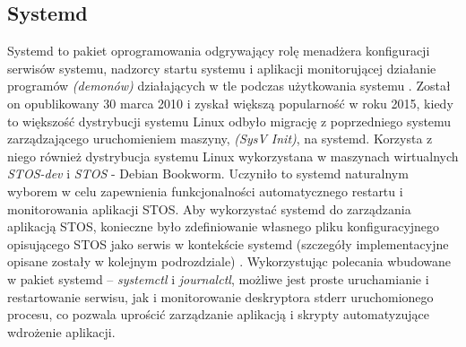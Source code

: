 \subsection{Systemd}
Systemd to pakiet oprogramowania odgrywający rolę menadżera konfiguracji serwisów systemu, nadzorcy startu systemu i aplikacji monitorującej działanie programów \textit{(demonów)} działających w tle podczas użytkowania systemu \cite{systemd}. Został on opublikowany 30 marca 2010 i zyskał większą popularność w roku 2015, kiedy to większość dystrybucji systemu Linux odbyło migrację z poprzedniego systemu zarządzającego uruchomieniem maszyny, \textit{(SysV Init)}, na systemd. Korzysta z niego również dystrybucja systemu Linux wykorzystana w maszynach wirtualnych \textit{STOS-dev} i \textit{STOS} - Debian Bookworm. Uczyniło to systemd naturalnym wyborem w celu zapewnienia funkcjonalności automatycznego restartu i monitorowania aplikacji STOS. 
\newline \noindent Aby wykorzystać systemd do zarządzania aplikacją STOS, konieczne było zdefiniowanie własnego pliku konfiguracyjnego opisującego STOS jako serwis w kontekście systemd (szczegóły implementacyjne opisane zostały w kolejnym podrozdziale) \cite{systemd-service}. Wykorzystując polecania wbudowane w pakiet systemd -- \textit{systemctl} i \textit{journalctl}, możliwe jest proste uruchamianie i restartowanie serwisu, jak i monitorowanie deskryptora stderr uruchomionego procesu, co pozwala uprościć zarządzanie aplikacją i skrypty automatyzujące wdrożenie aplikacji.
